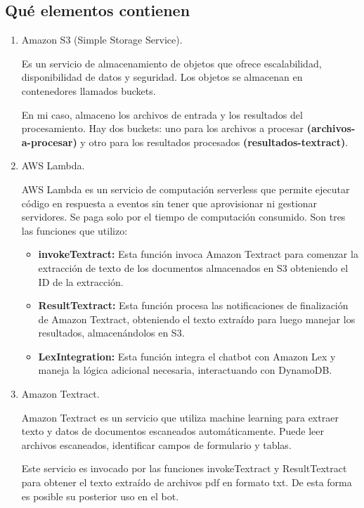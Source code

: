 \subsection{Qué elementos contienen}\label{elementos-aws}
\begin{enumerate}

    \item Amazon S3 (Simple Storage Service).
    
    Es un servicio de almacenamiento de objetos que ofrece escalabilidad, disponibilidad de datos y seguridad. Los objetos se almacenan en contenedores llamados buckets. 
    
    En mi caso, almaceno los archivos de entrada y los resultados del procesamiento. Hay dos buckets: uno para los archivos a procesar \textbf{(archivos-a-procesar)} y otro para los resultados procesados \textbf{(resultados-textract)}.
    \item AWS Lambda.

    AWS Lambda es un servicio de computación serverless que permite ejecutar código en respuesta a eventos sin tener que aprovisionar ni gestionar servidores. Se paga solo por el tiempo de computación consumido. Son tres las funciones que utilizo:
    \begin{itemize}
        \item \textbf{invokeTextract:} Esta función invoca Amazon Textract para comenzar la extracción de texto de los documentos almacenados en S3 obteniendo el ID de la extracción.
        \item \textbf{ResultTextract:} Esta función procesa las notificaciones de finalización de Amazon Textract, obteniendo el texto extraído para luego manejar los resultados, almacenándolos en S3.
        \item \textbf{LexIntegration:} Esta función integra el chatbot con Amazon Lex y maneja la lógica adicional necesaria, interactuando con DynamoDB.
    \end{itemize}

    \item Amazon Textract.

    Amazon Textract es un servicio que utiliza machine learning para extraer texto y datos de documentos escaneados automáticamente. Puede leer archivos escaneados, identificar campos de formulario y tablas.

    Este servicio es invocado por las funciones invokeTextract y ResultTextract para obtener el texto extraído de archivos pdf en formato txt. De esta forma es posible su posterior uso en el bot.
    

\end{enumerate}
